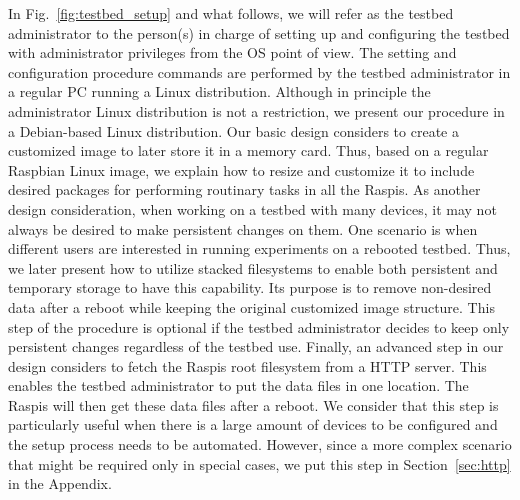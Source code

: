 In Fig.~\ref{fig:testbed_setup} and what follows, we will refer as the
testbed administrator to the person(s) in charge of setting up and
configuring the testbed with administrator privileges from the \ac{OS}
point of view. The setting and configuration procedure commands are
performed by the testbed administrator in a regular \ac{PC} running a
Linux distribution. Although in principle the administrator
Linux distribution is not a restriction, we present our procedure in a
Debian-based Linux distribution. Our basic design considers to create
a customized image to later store it in a memory card. Thus, based on a
regular Raspbian Linux image, we explain how to resize and customize it to
include desired packages for performing routinary tasks in all the
\ac{Raspi}s. As another design consideration, when working on a testbed
with many devices, it may not always be desired to make persistent changes
on them. One scenario is when different users are interested in
running experiments on a rebooted testbed. Thus, we later present how
to utilize stacked filesystems to enable both persistent and
temporary storage to have this capability. Its purpose is to
remove non-desired data after a reboot while keeping the original
customized image structure. This step of the procedure is optional if
the testbed administrator decides to keep only persistent changes regardless
of the testbed use. Finally, an advanced step in our design considers to
fetch the \ac{Raspi}s root filesystem from a \ac{HTTP} server. This enables the
testbed administrator to put the data files in one location. The
\ac{Raspi}s will then get these data files after a reboot. We consider
that this step is particularly useful when there is a large amount
of devices to be configured and the setup process needs to be automated.
However, since a more complex scenario that might be required only in special
cases, we put this step in Section~\ref{sec:http} in the Appendix.